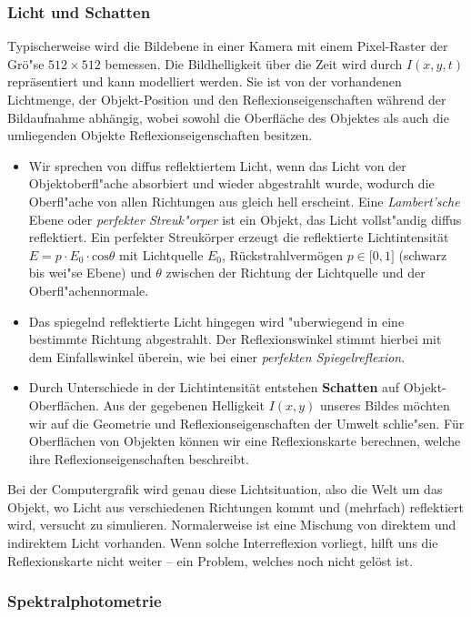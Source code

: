 \subsubsection{Licht und Schatten}

Typischerweise wird die Bildebene in einer Kamera mit einem Pixel-Raster der Grö"se $512\times 512$ bemessen. Die Bildhelligkeit über die Zeit wird durch $I(x,y,t)$ repräsentiert und kann modelliert werden. Sie ist von der vorhandenen Lichtmenge, der Objekt-Position und den Reflexionseigenschaften während der Bildaufnahme abhängig, wobei sowohl die Oberfläche des Objektes als auch die umliegenden Objekte Reflexionseigenschaften besitzen.
\begin{itemize}
\item
Wir sprechen von diffus reflektiertem Licht, wenn das Licht von der Objektoberfl"ache absorbiert und wieder abgestrahlt wurde, wodurch die Oberfl"ache von allen Richtungen aus gleich hell erscheint. Eine \textit{Lambert'sche} Ebene oder \emph{perfekter Streuk"orper} ist ein Objekt, das Licht vollst"andig diffus reflektiert. Ein perfekter Streukörper erzeugt die reflektierte Lichtintensität
$E = p\cdot E_0\cdot \mathrm{cos}\theta$
mit Lichtquelle $E_0$, Rückstrahlvermögen $p\in\lbrack 0,1\rbrack$ (schwarz bis wei"se Ebene) und $\theta$ zwischen der Richtung der Lichtquelle und der Oberfl"achennormale.
\item
Das spiegelnd reflektierte Licht hingegen wird "uberwiegend in eine bestimmte Richtung abgestrahlt. Der Reflexionswinkel stimmt hierbei mit dem Einfallswinkel überein, wie bei einer \textit{perfekten Spiegelreflexion}.
\item
Durch Unterschiede in der Lichtintensität entstehen \textbf{Schatten} auf Objekt-Oberflächen. Aus der gegebenen Helligkeit $I(x,y)$ unseres Bildes möchten wir auf die Geometrie und Reflexionseigenschaften der Umwelt schlie"sen. Für Oberflächen von Objekten können wir eine Reflexionskarte berechnen, welche ihre Reflexionseigenschaften beschreibt.
\end{itemize}
Bei der Computergrafik wird genau diese Lichtsituation, also die Welt um das Objekt, wo Licht aus verschiedenen Richtungen kommt und (mehrfach) reflektiert wird, versucht zu simulieren.
Normalerweise ist eine Mischung von direktem und indirektem Licht vorhanden. Wenn solche Interreflexion vorliegt, hilft uns die Reflexionskarte nicht weiter -- ein Problem, welches noch nicht gelöst ist.

\subsubsection{Spektralphotometrie}

